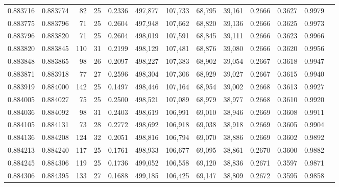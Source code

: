 \begin{tabular}{rrrrrrrrrrrrr}
0.883716 & 0.883774 &    82 &  25 &                                     0.2336 & 497,877 & 107,733 &  68,795 &  39,161 & 0.2666 & 0.3627 & 0.9979 \\
0.883775 & 0.883796 &    71 &  25 &                                     0.2604 & 497,948 & 107,662 &  68,820 &  39,136 & 0.2666 & 0.3625 & 0.9973 \\
0.883796 & 0.883820 &    71 &  25 &                                     0.2604 & 498,019 & 107,591 &  68,845 &  39,111 & 0.2666 & 0.3623 & 0.9966 \\
0.883820 & 0.883845 &   110 &  31 &                                     0.2199 & 498,129 & 107,481 &  68,876 &  39,080 & 0.2666 & 0.3620 & 0.9956 \\
0.883848 & 0.883865 &    98 &  26 &                                     0.2097 & 498,227 & 107,383 &  68,902 &  39,054 & 0.2667 & 0.3618 & 0.9947 \\
0.883871 & 0.883918 &    77 &  27 &                                     0.2596 & 498,304 & 107,306 &  68,929 &  39,027 & 0.2667 & 0.3615 & 0.9940 \\
0.883919 & 0.884000 &   142 &  25 &                                     0.1497 & 498,446 & 107,164 &  68,954 &  39,002 & 0.2668 & 0.3613 & 0.9927 \\
0.884005 & 0.884027 &    75 &  25 &                                     0.2500 & 498,521 & 107,089 &  68,979 &  38,977 & 0.2668 & 0.3610 & 0.9920 \\
0.884036 & 0.884092 &    98 &  31 &                                     0.2403 & 498,619 & 106,991 &  69,010 &  38,946 & 0.2669 & 0.3608 & 0.9911 \\
0.884105 & 0.884131 &    73 &  28 &                                     0.2772 & 498,692 & 106,918 &  69,038 &  38,918 & 0.2669 & 0.3605 & 0.9904 \\
0.884136 & 0.884208 &   124 &  32 &                                     0.2051 & 498,816 & 106,794 &  69,070 &  38,886 & 0.2669 & 0.3602 & 0.9892 \\
0.884213 & 0.884240 &   117 &  25 &                                     0.1761 & 498,933 & 106,677 &  69,095 &  38,861 & 0.2670 & 0.3600 & 0.9882 \\
0.884245 & 0.884306 &   119 &  25 &                                     0.1736 & 499,052 & 106,558 &  69,120 &  38,836 & 0.2671 & 0.3597 & 0.9871 \\
0.884306 & 0.884395 &   133 &  27 &                                     0.1688 & 499,185 & 106,425 &  69,147 &  38,809 & 0.2672 & 0.3595 & 0.9858 \\

\end{tabular}
